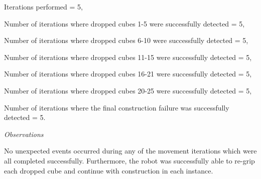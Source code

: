 \begin{compactitem}
	\item Iterations performed = 5,
	\item Number of iterations where dropped cubes 1-5 were successfully detected = 5,
	\item Number of iterations where dropped cubes 6-10 were successfully detected = 5,
	\item Number of iterations where dropped cubes 11-15 were successfully detected = 5,
	\item Number of iterations where dropped cubes 16-21 were successfully detected = 5,
	\item Number of iterations where dropped cubes 20-25 were successfully detected = 5,
	\item Number of iterations where the final construction failure was successfully detected = 5.
\end{compactitem}

\textit{Observations}

No unexpected events occurred during any of the movement iterations which were all completed successfully. Furthermore, the robot was successfully able to re-grip each dropped cube and continue with construction in each instance.

\newpage




